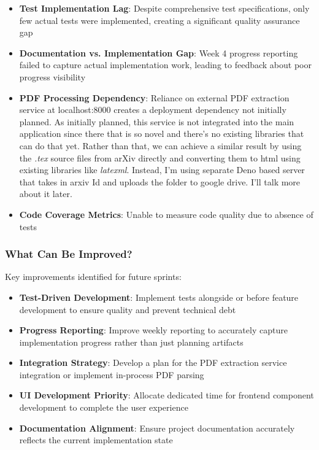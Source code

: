 \documentclass[12pt]{article}
\begin{document}
\begin{itemize}
  \item \textbf{Test Implementation Lag}: Despite comprehensive test specifications, only few actual tests were implemented, creating a significant quality assurance gap
  \item \textbf{Documentation vs. Implementation Gap}: Week 4 progress reporting failed to capture actual implementation work, leading to feedback about poor progress visibility
  \item \textbf{PDF Processing Dependency}: Reliance on external PDF extraction service at localhost:8000 creates a deployment dependency not initially planned. As initially planned, this service is not integrated into the main application since there that is so novel and there's no existing libraries that can do that yet. Rather than that, we can achieve a similar result by using the \textit{.tex} source files from arXiv directly and converting them to html using existing libraries like \textit{latexml}. Instead, I'm using separate Deno based server that takes in arxiv Id and uploads the folder to google drive. I'll talk more about it later.
  \item \textbf{Code Coverage Metrics}: Unable to measure code quality due to absence of tests
\end{itemize}

\subsubsection{What Can Be Improved?}
Key improvements identified for future sprints:

\begin{itemize}
  \item \textbf{Test-Driven Development}: Implement tests alongside or before feature development to ensure quality and prevent technical debt
  \item \textbf{Progress Reporting}: Improve weekly reporting to accurately capture implementation progress rather than just planning artifacts
  \item \textbf{Integration Strategy}: Develop a plan for the PDF extraction service integration or implement in-process PDF parsing
  \item \textbf{UI Development Priority}: Allocate dedicated time for frontend component development to complete the user experience
  \item \textbf{Documentation Alignment}: Ensure project documentation accurately reflects the current implementation state
\end{itemize}
\end{document}
